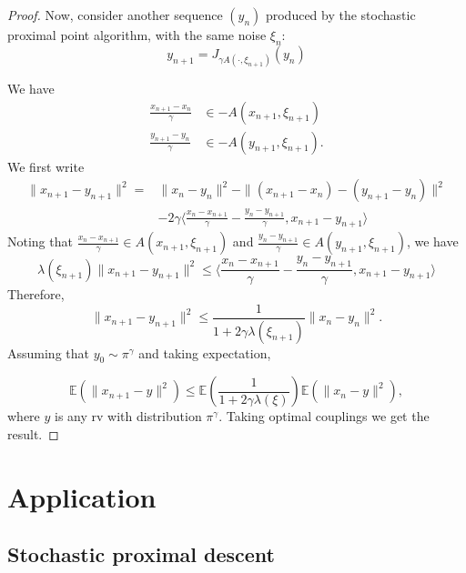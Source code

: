 \documentclass{article}
\newcommand{\1}{\mathbbm 1}
\newcommand{\bE}{{{\mathbb E}}}
\newcommand{\ps}[1]{\langle #1 \rangle}
\theoremstyle{definition}
\begin{document}
\begin{proof}

Now, consider another sequence $(y_n)$ produced by the stochastic proximal point algorithm, with the same noise $\xi_n$:
\begin{equation}
    y_{n+1} = J_{\gamma A(\cdot,\xi_{n+1})}(y_n)
\end{equation}

We have 
\begin{align}
    \frac{x_{n+1} - x_n}{\gamma} &\in - A(x_{n+1},\xi_{n+1}) \label{eq:x}\\
    \frac{y_{n+1} - y_n}{\gamma} &\in - A(y_{n+1},\xi_{n+1}) \label{eq:y}.
\end{align}
We first write
\begin{align}
    \|x_{n+1} - y_{n+1}\|^2 = &\|x_{n} - y_n\|^2 - \|(x_{n+1} - x_n) - (y_{n+1} - y_n)\|^2 \label{eq:square}\\
    &-2\gamma\ps{\frac{x_n - x_{n+1}}{\gamma} - \frac{y_n - y_{n+1}}{\gamma}, x_{n+1} - y_{n+1}}
\label{eq:inner}
\end{align}
Noting that $\frac{x_n - x_{n+1}}{\gamma} \in A(x_{n+1},\xi_{n+1})$ and $\frac{y_n - y_{n+1}}{\gamma} \in A(y_{n+1},\xi_{n+1})$, we have
\begin{equation}
    \lambda(\xi_{n+1})\|x_{n+1} - y_{n+1}\|^2 \leq \ps{\frac{x_n - x_{n+1}}{\gamma} - \frac{y_n - y_{n+1}}{\gamma}, x_{n+1} - y_{n+1}}
\end{equation}
Therefore, 
\begin{equation}
    \|x_{n+1} - y_{n+1}\|^2 \leq \frac{1}{1+2\gamma\lambda(\xi_{n+1})}\|x_{n} - y_{n}\|^2.
\end{equation}
Assuming that $y_0 \sim \pi^\gamma$ and taking expectation,

\begin{equation}
    \bE(\|x_{n+1} - y\|^2) \leq \bE\left(\frac{1}{1+2\gamma\lambda(\xi)}\right) \bE(\|x_{n} - y\|^2),
\end{equation}
where $y$ is any rv with distribution $\pi^\gamma$.
Taking optimal couplings we get the result.
\end{proof}
\section{Application}

\subsection{Stochastic proximal descent}
\end{document}

